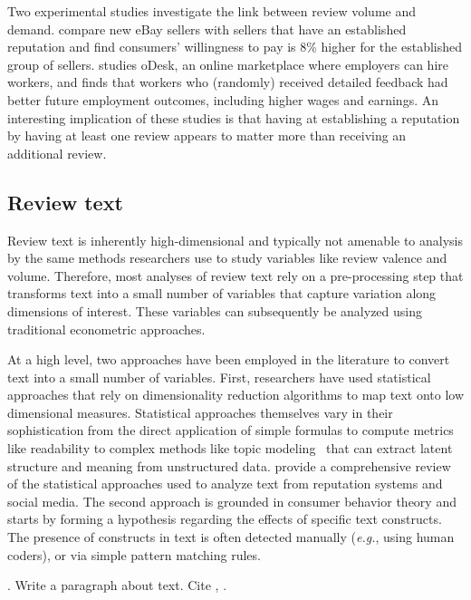 \documentclass[letter,12pt]{article}
\begin{document}
Two experimental studies investigate the link between review volume and
demand. \citet{resnick2006value} compare new eBay sellers with sellers that
have an established reputation and find consumers' willingness to pay is 8\%
higher for the established group of sellers. \citet{pallais2014inefficient}
studies oDesk, an online marketplace where employers can hire workers, and
finds that workers who (randomly) received detailed feedback had better future
employment outcomes, including higher wages and earnings. An interesting
implication of these studies is that having at establishing a reputation by
having at least one review appears to matter more than receiving an additional
review.

\subsection{Review text}

Review text is inherently high-dimensional and typically not amenable to
analysis by the same methods researchers use to study variables like review
valence and volume. Therefore, most analyses of review text rely on a
pre-processing step that transforms text into a small number of variables that
capture variation along dimensions of interest. These variables can
subsequently be analyzed using traditional econometric approaches.

At a high level, two approaches have been employed in the literature to
convert text into a small number of variables. First, researchers have used
statistical approaches that rely on dimensionality reduction algorithms to map
text onto low dimensional measures. Statistical approaches themselves vary in
their sophistication from the direct application of simple formulas to compute
metrics like readability to complex methods like topic
modeling~\citep{blei2003latent} that can extract latent structure and meaning
from unstructured data. \citet{moe2017social} provide a comprehensive review
of the statistical approaches used to analyze text from reputation systems and
social media. The second approach is grounded in consumer behavior theory and
starts by forming a hypothesis regarding the effects of specific text
constructs. The presence of constructs in text is often detected manually
(\emph{e.g.}, using human coders), or via simple pattern matching rules.

\citet{buschken2016sentence}. 
Write a paragraph about text. Cite \citet{ghose2012designing},
\citet{packard2017language}.
\end{document}
